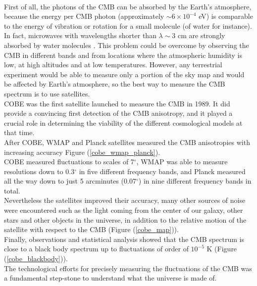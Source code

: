 \documentclass{article}
\begin{document}
\\
First of all, the photons of the CMB can be absorbed by the Earth's atmosphere, because the energy per CMB photon (approximately $\sim 6 \times 10 ^{-4}$ eV) is comparable to the energy of vibration or rotation for a small molecule (of water for instance). 
In fact, microwaves with wavelengths shorter than $\lambda \sim 3$ cm are strongly absorbed by water molecules \citep{RydenIntroCosmoPdf}.
This problem could be overcome by observing the CMB in different bands and from locations where the atmospheric humidity is low, at high altitudes and at low temperatures.
However, any terrestrial experiment would be able to measure only a portion of the sky map and would be affected by Earth's atmosphere, so the best way to measure the CMB spectrum is to use satellites.\\
COBE was the first satellite launched to measure the CMB in 1989. 
It did provide a convincing first detection of the CMB anisotropy, and it played a crucial role in determining the viability of the different cosmological models at that time.
\\
After COBE, WMAP and Planck satellites measured the CMB anisotropies with increasing accuracy  Figure (\ref{cobe_wmap_planck}).\\
COBE measured fluctuations to scales of 7$^\circ$, WMAP was able to measure resolutions down to 0.3$^\circ$ in five different frequency bands, and Planck measured all the way down to just 5 arcminutes (0.07$^\circ$) in nine different frequency bands in total.\\
Nevertheless the satellites improved their accuracy, many other sources of noise were encountered such as the light coming from the center of our galaxy, other stars and other objects in the universe, in addition to the relative motion of the satellite with respect to the CMB (Figure (\ref{cobe_map})).\\ 
Finally, observations and statistical analysis showed that the CMB spectrum is close to a black body spectrum up to fluctuations of order of $10^{-5}$ K (Figure (\ref{cobe_blackbody})).\\
The technological efforts for precisely measuring the fluctuations of the CMB was a fundamental step-stone to understand what the universe is made of.
\end{document}
